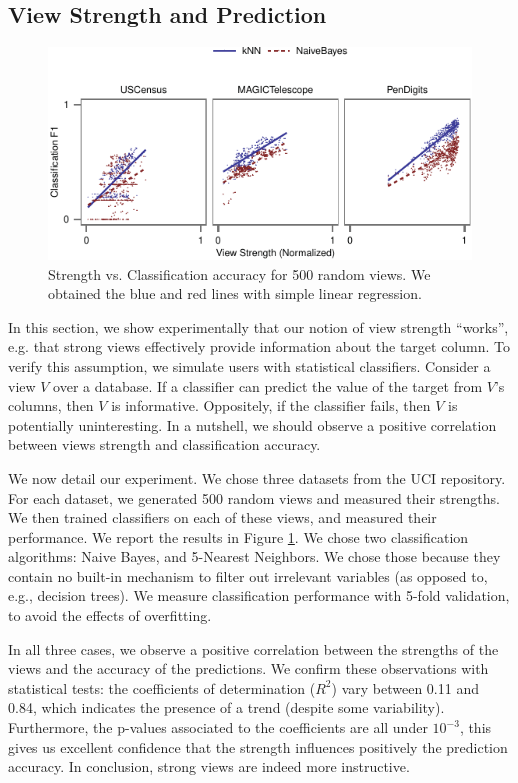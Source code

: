 \subsection{View Strength and Prediction}
\label{sec:view-strengh}
\begin{figure}[t!]
\centering
\includegraphics[width=\columnwidth]{plots/compare-strength-f1}
\caption{Strength vs. Classification accuracy for 500 random views. We obtained
    the blue and red lines with simple linear regression.}
\label{pic:strength-vs-f1}
\end{figure}
In this section, we show experimentally that our notion of view strength
``works'', e.g. that strong views effectively provide information about the
target column. To verify this assumption, we simulate users with statistical
classifiers. Consider a view $V$ over a database. If a classifier can predict
the value of the target from $V$'s columns, then $V$ is informative.
Oppositely, if the classifier fails, then $V$ is potentially uninteresting. In
a nutshell, we should observe a positive correlation between views strength
and classification accuracy.

We now detail our experiment. We chose three datasets from the UCI repository.
For each dataset, we generated 500 random views and measured their strengths.
We then trained classifiers on each of these views, and measured their
performance. We report the results in Figure \ref{pic:strength-vs-f1}. We chose
two classification algorithms: Naive Bayes, and 5-Nearest Neighbors.  We chose
those because they contain no built-in mechanism to filter out irrelevant
variables (as opposed to, e.g., decision trees). We measure classification
performance with 5-fold validation, to avoid the effects of overfitting.

In all three cases, we observe a positive correlation between the strengths of
the views and the accuracy of the predictions. We confirm these observations
with statistical tests: the coefficients of determination ($R^2$) vary between
0.11 and 0.84, which indicates the presence of a trend (despite some
variability). Furthermore, the p-values associated to the coefficients are all
under $10^{-3}$, this gives us excellent confidence that the strength
influences positively the prediction accuracy. In conclusion, strong views are
indeed more instructive.


